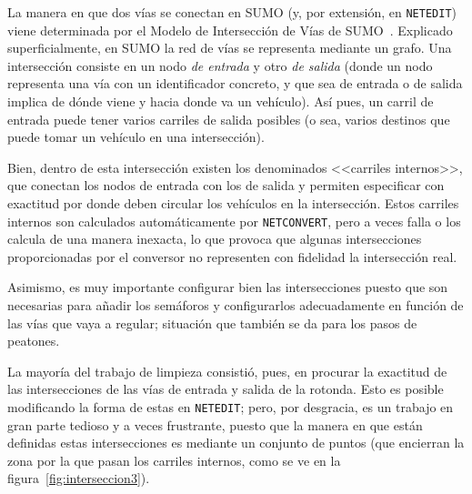 La manera en que dos vías se conectan en SUMO (y, por extensión, en \texttt{NETEDIT}) viene determinada por el Modelo de Intersección de Vías de SUMO~\cite{erdmann_sumos_2014}. Explicado superficialmente, en SUMO la red de vías se representa mediante un grafo. Una intersección consiste en un nodo \textit{de entrada} y otro \textit{de salida} (donde un nodo representa una vía con un identificador concreto, y que sea de entrada o de salida implica de dónde viene y hacia donde va un vehículo). Así pues, un carril de entrada puede tener varios carriles de salida posibles (o sea, varios destinos que puede tomar un vehículo en una intersección).

Bien, dentro de esta intersección existen los denominados <<carriles internos>>, que conectan los nodos de entrada con los de salida y permiten especificar con exactitud por donde deben circular los vehículos en la intersección. Estos carriles internos son calculados automáticamente por \texttt{NETCONVERT}, pero a veces falla o los calcula de una manera inexacta, lo que provoca que algunas intersecciones proporcionadas por el conversor no representen con fidelidad la  intersección real.

Asimismo, es muy importante configurar bien las intersecciones puesto que son necesarias para añadir los semáforos y configurarlos adecuadamente en función de las vías que vaya a regular; situación que también se da para los pasos de peatones.

La mayoría del trabajo de limpieza consistió, pues, en procurar la exactitud de las intersecciones de las vías de entrada y salida de la rotonda. Esto es posible modificando la forma de estas en \texttt{NETEDIT}; pero, por desgracia, es un trabajo en gran parte tedioso y a veces frustrante, puesto que la manera en que están definidas estas intersecciones es mediante un conjunto de puntos (que encierran la zona por la que pasan los carriles internos, como se ve en la figura~\ref{fig:interseccion3}). 

